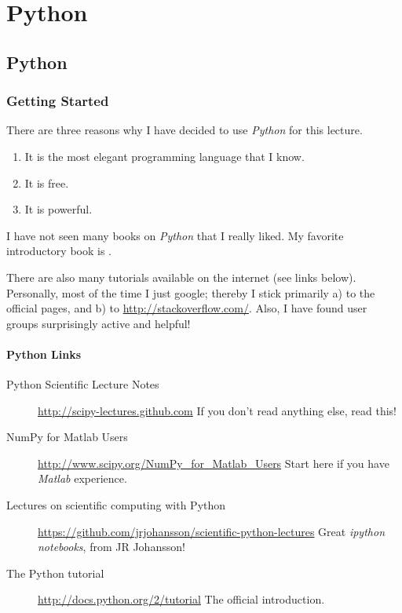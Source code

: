 \part{Python}

\chapter{Python}

\section{Getting Started}

There are three reasons why I have decided to use \emph{Python} for this lecture.

\begin{enumerate}
  \item It is the most elegant programming language that I know.
  \item It is free.
  \item It is powerful.
\end{enumerate}

I have not seen many books on \emph{Python} that I really liked. My favorite introductory book is \cite{Harms2010}.

There are also many tutorials available on the internet (see links below). Personally, most of the time I just google; thereby I stick primarily a) to the official pages, and b) to \url{http://stackoverflow.com/}. Also, I have found user groups surprisingly active and helpful!

\subsection{Python Links}

\begin{description}
  \item[Python Scientific Lecture Notes] \url{http://scipy-lectures.github.com} If you don't read anything else, read this!
  \item[NumPy for Matlab Users] \url{http://www.scipy.org/NumPy\_for\_Matlab\_Users} Start here if you have \emph{Matlab} experience.
  \item[Lectures on scientific computing with Python] \url{https://github.com/jrjohansson/scientific-python-lectures} Great \emph{ipython notebooks}, from JR Johansson!
  \item[The Python tutorial] \url{http://docs.python.org/2/tutorial} The official introduction.
\end{description}

